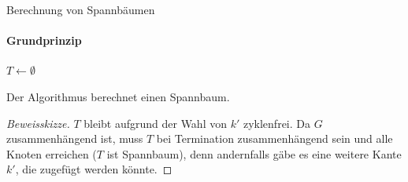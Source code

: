 \documentclass{vorlesung}
\begin{document}
\begin{frame}{Berechnung von Spannbäumen}
\framesubtitle{Grundprinzip}
\begin{algorithm}[H]
\DontPrintSemicolon
{} %
$T \gets \emptyset$\;
\While {$\exists k \in E. \{k\}\cup T$ ist zyklenfrei}{%
 Wähle $k \in E$, so dass $\{k\}\cup T$ zyklenfrei bleibt\;
 $T \gets T \cup \{k'\}$\;
}
\caption{\textsc{Extend-Spanning-Tree}}
\end{algorithm}
\begin{theorem}
 Der Algorithmus berechnet einen Spannbaum.
\end{theorem}
\begin{proof}[Beweisskizze]
$T$ bleibt aufgrund der Wahl von $k'$ zyklenfrei. Da $G$ zusammenhängend ist, muss $T$ bei Termination zusammenhängend sein und alle Knoten erreichen ($T$ ist Spannbaum), denn andernfalls gäbe es eine weitere Kante $k'$, die zugefügt werden könnte. 
\end{proof}
\end{frame}
%
\end{document}
